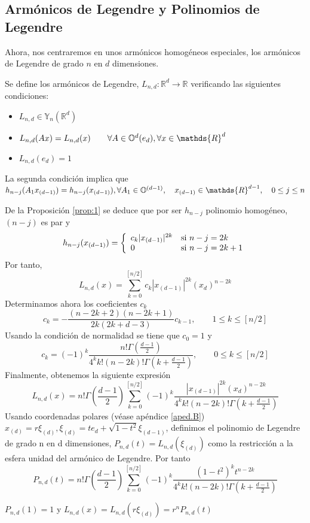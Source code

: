 \subsection{Armónicos de Legendre y Polinomios de Legendre}
Ahora, nos centraremos en unos armónicos homogéneos especiales, los armónicos de Legendre de grado $n$ en $d$ dimensiones.
\begin{defn}
	Se define los armónicos de Legendre, $L_{n,d}:\mathds{R}^d\to\mathds{R}$ verificando las siguientes condiciones:
	\begin{itemize}
		\item $L_{n,d} \in \mathds{Y}_n(\mathds{R}^d)$ 
		\item $L_{n,d}(Ax) = L_{n,d}(x) \qquad  \forall A \in \orto(e_d), \forall x \in \mathds{R}^d$ 
		\item $L_{n,d}(e_d) = 1$
	\end{itemize}
\end{defn}
\begin{rem}
	
La segunda condición implica que $h_{n-j}(A_1x_{(d-1)})=h_{n-j}(x_{(d-1)}), \\\forall A_1\in \mathbb{O}^{(d-1)},\quad x_{(d-1)}\in\mathds{R}^{d-1}, \quad 0\le j\le n$
\end{rem}
De la Proposición \ref{prop:1}
se deduce que por ser $h_{n-j}$ polinomio homogéneo,\\$(n-j)$ es par y 
\begin{equation}
h_{n-j}(x_{(d-1)}) = \left\lbrace
\begin{array}{ll}
c_k|x_{(d-1)}|^{2k} & \textup{si } n-j=2k \\
0 & \textup{si } n-j=2k+1
\end{array}
\right.
\end{equation}
Por tanto,
$$
L_{n,d}(x) = \sum_{k=0}^{[n/2]} c_k|x_{(d-1)}|^{2k}(x_d)^{n-2k}
$$
Determinamos ahora los coeficientes $c_k$
$$
c_k = - \frac{(n-2k+2)(n-2k+1)}{2k(2k+d-3)}c_{k-1}, \qquad 1\le k \le [n/2]
$$
Usando la condición de normalidad se tiene que $c_0 = 1$ y $$
c_k = (-1)^k \frac{n!\Gamma(\frac{d-1}{2})}{4^kk!(n-2k)!\Gamma(k+\frac{d-1}{2})}, \qquad 0\le k \le [n/2]
$$
Finalmente, obtenemos la siguiente expresión 
$$
L_{n,d}(x) = n!\Gamma(\frac{d-1}{2})\sum_{k=0}^{[n/2]}(-1)^k\frac{|x_{(d-1)}|^{2k}(x_d)^{n-2k}}{4^kk!(n-2k)!\Gamma(k+\frac{d-1}{2})}
$$
Usando coordenadas polares (véase apéndice \ref{aped.B}) $x_{(d)}=r\xi_{(d)},\xi_{(d)} = te_d+\sqrt{1-t^2}\xi_{(d-1)}$, definimos el polinomio de Legendre de grado n en d dimensiones, $P_{n,d}(t) = L_{n,d}(\xi_{(d)})$ como la restricción a la esfera unidad del armónico de Legendre. Por tanto $$
P_{n,d}(t)=n!\Gamma(\frac{d-1}{2})\sum_{k=0}^{[n/2]}(-1)^k\frac{(1-t^2)^{k}t^{n-2k}}{4^kk!(n-2k)!\Gamma(k+\frac{d-1}{2})}
$$
\begin{rem}
$P_{n,d}(1)=1$ y $L_{n,d}(x) = L_{n,d}(r\xi_{(d)}) = r^nP_{n,d}(t)$
\end{rem}
